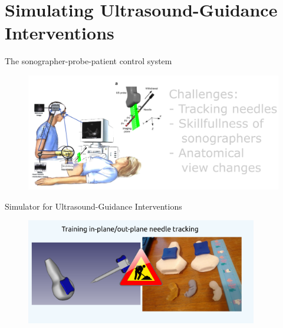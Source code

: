 \section{Simulating Ultrasound-Guidance Interventions}


{
\begin{frame}{The sonographer-probe-patient control system}
      \begin{figure}
        \centering
        \includegraphics[width=1.0\textwidth]{./figures/sonographer-probe-patient/versions/drawing-v02.png}
      \end{figure}
\end{frame}
}


{
\begin{frame}{Simulator for Ultrasound-Guidance Interventions}
      \begin{figure}
        \centering
        \includegraphics[width=0.9\textwidth]{./figures/sugi/simulator/versions/drawing-v00.png}
      \end{figure}
\end{frame}
}



